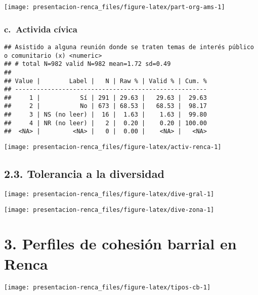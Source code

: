 \documentclass[
]{article}
\begin{document}
\begin{flushleft}\texttt{[image: presentacion-renca\_files/figure-latex/part-org-ams-1]} \end{flushleft}

\hypertarget{c.-activida-cuxedvica}{%
\subsubsection{c.~Activida cívica}\label{c.-activida-cuxedvica}}

\begin{verbatim}
## Asistido a alguna reunión donde se traten temas de interés público o comunitario (x) <numeric> 
## # total N=982 valid N=982 mean=1.72 sd=0.49
## 
## Value |        Label |   N | Raw % | Valid % | Cum. %
## -----------------------------------------------------
##     1 |           Sí | 291 | 29.63 |   29.63 |  29.63
##     2 |           No | 673 | 68.53 |   68.53 |  98.17
##     3 | NS (no leer) |  16 |  1.63 |    1.63 |  99.80
##     4 | NR (no leer) |   2 |  0.20 |    0.20 | 100.00
##  <NA> |         <NA> |   0 |  0.00 |    <NA> |   <NA>
\end{verbatim}

\begin{flushleft}\texttt{[image: presentacion-renca\_files/figure-latex/activ-renca-1]} \end{flushleft}

\hypertarget{tolerancia-a-la-diversidad}{%
\subsection{2.3. Tolerancia a la
diversidad}\label{tolerancia-a-la-diversidad}}

\begin{flushleft}\texttt{[image: presentacion-renca\_files/figure-latex/dive-gral-1]} \end{flushleft}

\begin{flushleft}\texttt{[image: presentacion-renca\_files/figure-latex/dive-zona-1]} \end{flushleft}

\hypertarget{perfiles-de-cohesiuxf3n-barrial-en-renca}{%
\section{3. Perfiles de cohesión barrial en
Renca}\label{perfiles-de-cohesiuxf3n-barrial-en-renca}}

\begin{flushleft}\texttt{[image: presentacion-renca\_files/figure-latex/tipos-cb-1]} \end{flushleft}
\end{document}

